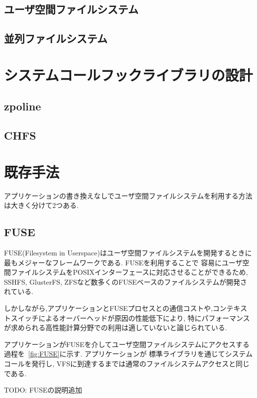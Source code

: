 \documentclass[a4paper,11pt]{jreport}
\begin{document}
\section{ユーザ空間ファイルシステム}

\section{並列ファイルシステム}

\chapter{システムコールフックライブラリの設計}

\section{zpoline}

\section{CHFS}

\chapter{既存手法}
アプリケーションの書き換えなしでユーザ空間ファイルシステムを利用する方法は大きく分けて2つある.
\section{FUSE}
FUSE(Filesystem in Userspace)はユーザ空間ファイルシステムを開発するときに最もメジャーなフレームワークである. FUSEを利用することで
容易にユーザ空間ファイルシステムをPOSIXインターフェースに対応させることができるため, SSHFS\cite{hoskins2006sshfs}, GlusterFS\cite{davies2013scale}, 
ZFS\cite{rodeh2003zfs}など数多くのFUSEベースのファイルシステムが開発されている.

しかしながら,アプリケーションとFUSEプロセスとの通信コストや,コンテキストスイッチによるオーバーヘッドが原因の性能低下により, 
特にパフォーマンスが求められる高性能計算分野での利用は適していないと論じられている\cite{brinkmann2020ad}. 

アプリケーションがFUSEを介してユーザ空間ファイルシステムにアクセスする過程を\figurename~\ref{fig:FUSE}に示す. アプリケーションが
標準ライブラリを通じてシステムコールを発行し, VFSに到達するまでは通常のファイルシステムアクセスと同じである. 

TODO: FUSEの説明追加
\end{document}
